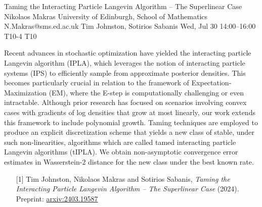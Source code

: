 \begin{talk}
  {Taming the Interacting Particle Langevin Algorithm – The Superlinear Case}%
  {Nikolaos Makras}%
  {University of Edinburgh, School of Mathematics}%
  {N.Makras@sms.ed.ac.uk}%
  {Tim Johnston, Sotirios Sabanis}%
  {}%
  {Wed, Jul 30 14:00–16:00}%
  {T10-4}%
  {T10}%
  
				
			
Recent advances in stochastic optimization have yielded the interacting particle Langevin algorithm (IPLA), which leverages the notion of interacting particle systems (IPS) to efficiently sample from approximate posterior densities. This becomes particularly crucial in relation to the framework of Expectation-Maximization (EM), where the E-step is computationally challenging or even intractable. Although prior research has focused on scenarios involving convex cases with gradients of log densities that grow at most linearly, our work extends this framework to include polynomial growth. Taming techniques are employed to produce an explicit discretization scheme that yields a new class of stable, under such non-linearities, algorithms which are called tamed interacting particle Langevin algorithms (tIPLA). We obtain non-asymptotic convergence error estimates in Wasserstein-2 distance for the new class under the best known rate. 

\medskip

\begin{enumerate}
	\item[{[1]}] Tim Johnston, Nikolaos Makras and Sotirios Sabanis, {\it Taming the Interacting Particle Langevin Algorithm – The Superlinear Case} (2024). Preprint: \href{https://arxiv.org/abs/2403.19587}{arxiv:2403.19587} 
\end{enumerate}

\end{talk}

